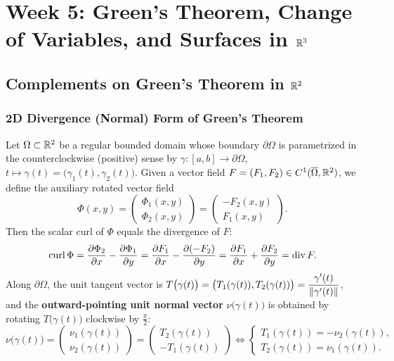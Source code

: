 
\chapter{Week 5: Green's Theorem, Change of Variables, and Surfaces in \texorpdfstring{$\mathbb{R}^3$}{R3}}

\section{Complements on Green's Theorem in \texorpdfstring{$\mathbb{R}^2$}{R2}}

\subsection{2D Divergence (Normal) Form of Green's Theorem}

Let $\Omega \subset \mathbb{R}^2$ be a regular bounded domain whose boundary $\partial\Omega$ is parametrized in the counterclockwise (positive) sense by $\gamma : [a,b] \to \partial\Omega$, $t \mapsto \gamma(t) = \big(\gamma_1(t), \gamma_2(t)\big)$. Given a vector field $F = (F_1, F_2) \in C^1(\overline{\Omega}, \mathbb{R}^2)$, we define the auxiliary rotated vector field
\[
    \Phi(x,y) = \begin{pmatrix} \Phi_1(x,y) \\ \Phi_2(x,y) \end{pmatrix} = \begin{pmatrix} -F_2(x,y) \\ F_1(x,y) \end{pmatrix}.
\]
Then the scalar curl of $\Phi$ equals the divergence of $F$:
\[
    \operatorname{curl} \Phi = \pdv{\Phi_2}{x} - \pdv{\Phi_1}{y} = \pdv{F_1}{x} - \pdv{(-F_2)}{y} = \pdv{F_1}{x} + \pdv{F_2}{y} = \operatorname{div} F.
\]
Along $\partial\Omega$, the unit tangent vector is $T\big(\gamma(t)\big) = \big(T_1(\gamma(t)), T_2(\gamma(t))\big) = \dfrac{\gamma'(t)}{\left\lVert\gamma'(t)\right\rVert}$, and the \textbf{outward-pointing unit normal vector} $\nu\big(\gamma(t)\big)$ is obtained by rotating $T\big(\gamma(t)\big)$ clockwise by $\frac{\pi}{2}$:
\[
    \nu\big(\gamma(t)\big) = \begin{pmatrix} \nu_1(\gamma(t)) \\ \nu_2(\gamma(t)) \end{pmatrix} = \begin{pmatrix} T_2(\gamma(t)) \\ -T_1(\gamma(t)) \end{pmatrix} \iff \begin{cases} T_1(\gamma(t)) = -\nu_2(\gamma(t)), \\ T_2(\gamma(t)) = \nu_1(\gamma(t)). \end{cases}
\]


